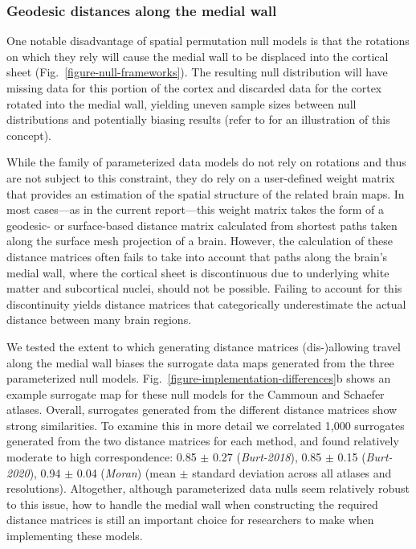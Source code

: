 \documentclass[12pt,aps,pra,reprint,showkeys]{revtex4-1}
\begin{document}
\subsubsection*{Geodesic distances along the medial wall}

One notable disadvantage of spatial permutation null models is that the rotations on which they rely will cause the medial wall to be displaced into the cortical sheet (Fig.~\ref{figure-null-frameworks}).
The resulting null distribution will have missing data for this portion of the cortex and discarded data for the cortex rotated into the medial wall, yielding uneven sample sizes between null distributions and potentially biasing results (refer to \citealt{burt2020neuroimage} for an illustration of this concept).

While the family of parameterized data models do not rely on rotations and thus are not subject to this constraint, they do rely on a user-defined weight matrix that provides an estimation of the spatial structure of the related brain maps.
In most cases---as in the current report---this weight matrix takes the form of a geodesic- or surface-based distance matrix calculated from shortest paths taken along the surface mesh projection of a brain.
However, the calculation of these distance matrices often fails to take into account that paths along the brain's medial wall, where the cortical sheet is discontinuous due to underlying white matter and subcortical nuclei, should not be possible.
Failing to account for this discontinuity yields distance matrices that categorically underestimate the actual distance between many brain regions.

We tested the extent to which generating distance matrices (dis-)allowing travel along the medial wall biases the surrogate data maps generated from the three parameterized null models.
Fig.~\ref{figure-implementation-differences}b shows an example surrogate map for these null models for the Cammoun and Schaefer atlases.
Overall, surrogates generated from the different distance matrices show strong similarities.
To examine this in more detail we correlated 1,000 surrogates generated from the two distance matrices for each method, and found relatively moderate to high correspondence: 0.85 $\pm$ 0.27 (\textit{Burt-2018}), 0.85 $\pm$ 0.15 (\textit{Burt-2020}), 0.94 $\pm$ 0.04 (\textit{Moran}) (mean $\pm$ standard deviation across all atlases and resolutions).
Altogether, although parameterized data nulls seem relatively robust to this issue, how to handle the medial wall when constructing the required distance matrices is still an important choice for researchers to make when implementing these models.
\end{document}
